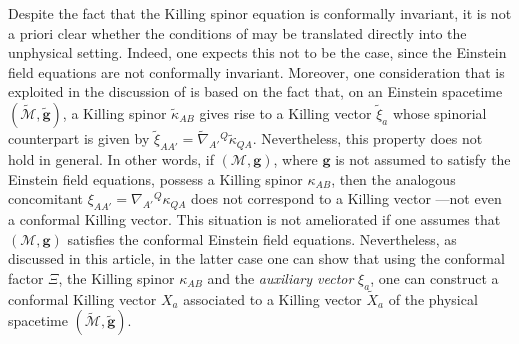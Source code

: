 \documentclass[10pt,a4paper]{article}
\theoremstyle{plain}
\def\bmg{{\bm g}}
\begin{document}
Despite the fact that the
Killing spinor equation is conformally invariant, it is not a priori
clear whether the conditions 
of \cite{GarVal08c, BaeVal10b} may be translated directly into the unphysical setting.
Indeed, one expects this not to be the case, since the Einstein field equations
are not conformally invariant. Moreover, one consideration that is
exploited in the discussion of \cite{GarVal08c} is based on the fact
that, on an Einstein spacetime $(\tilde{\mathcal{M}},\tilde{\bmg})$, a
Killing spinor $\tilde{\kappa}_{AB}$ gives rise to a Killing vector
$\tilde{\xi}_{a}$ whose spinorial counterpart is given by
$\tilde{\xi}_{AA'}=\tilde{\nabla}_{A'}{}^{Q}\tilde{\kappa}_{QA}$. Nevertheless,
this property does not hold in general. In other words, if
$(\mathcal{M},\bmg)$, where $\bmg$ is not assumed to satisfy the
Einstein field equations, possess a Killing spinor $\kappa_{AB}$, then
the analogous concomitant $\xi_{AA'}=\nabla_{A'}{}^{Q}\kappa_{QA}$
does not correspond to a Killing vector ---not even a conformal
Killing vector.  This situation is not ameliorated if one assumes that
$(\mathcal{M},\bmg)$ satisfies the conformal Einstein field
equations. Nevertheless, as discussed in this article, in the latter
case one can show that using the conformal factor $\Xi$, the Killing
spinor $\kappa_{AB}$ and the \emph{auxiliary vector} $\xi_{a}$, one
can construct a conformal Killing vector $X_{a}$ associated to a
Killing vector $\tilde{X}_{a}$ of the physical spacetime
$(\tilde{\mathcal{M}},\tilde{\bmg})$.


\medskip
\end{document}
